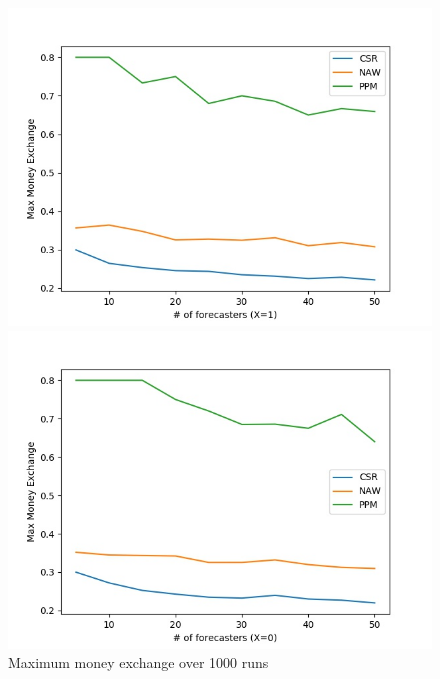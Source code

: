 \documentclass[english,10pt]{article}
\begin{document}
\begin{enumerate}
        	\begin{figure}[H]
        	\centering
        	\begin{minipage}{0.48\textwidth}
        	\includegraphics[width = \textwidth]{(Beta_0dot3_0dot3)Max_MnEx(X=1).jpg}
        	\end{minipage}
        	\begin{minipage}{0.48\textwidth}
        	\includegraphics[width = \textwidth]{(Beta_0dot3_0dot3)Max_MnEx(X=0).jpg}
        	\end{minipage}
        	\caption{Maximum money exchange over 1000 runs}
        	\end{figure}
        	

\end{enumerate}
\end{document}
